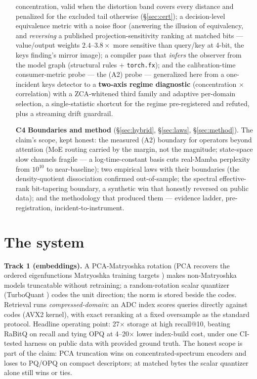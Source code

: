 \documentclass[11pt]{article}
\begin{document}
\begin{enumerate}
  concentration, valid when the distortion band covers every distance and
  penalized for the excluded tail otherwise (\S\ref{sec:cert}); a decision-level equivalence metric with a
  noise floor (answering the illusion of equivalency, and \emph{reversing} a
  published projection-sensitivity ranking at matched bits --- value/output
  weights $2.4$--$3.8\times$ more sensitive than query/key at 4-bit, the keys finding's mirror
  image); a compiler pass that \emph{infers} the observer from the model graph
  (structural rules $+$ \texttt{torch.fx}); and the calibration-time
  consumer-metric probe --- the (A2) probe --- generalized here from a one-incident
  keys detector to a \textbf{two-axis regime diagnostic} (concentration $\times$
  correlation) with a ZCA-whitened third family and adaptive per-domain selection,
  a single-statistic shortcut for the regime pre-registered and refuted, plus a
  streaming drift guardrail.
\item[\textbf{C4}] \textbf{Boundaries and method} (\S\ref{sec:hybrid},
  \S\ref{sec:laws}, \S\ref{sec:method}). The claim's scope, kept honest: the
  measured (A2) boundary for operators beyond attention (MoE routing carried by the
  margin, not the magnitude; state-space slow channels fragile --- a
  log-time-constant basis cuts real-Mamba perplexity from $10^{10}$ to
  near-baseline); two empirical laws with their boundaries (the density-quotient
  dissociation confirmed out-of-sample; the spectral effective-rank bit-tapering
  boundary, a synthetic win that honestly reversed on public data); and the
  methodology that produced them --- evidence ladder, pre-registration,
  incident-to-instrument.
\end{enumerate}

\section{The system}\label{sec:system}
\textbf{Track 1 (embeddings).} A PCA-Matryoshka rotation (PCA recovers the
ordered eigenfunctions Matryoshka training targets \cite{varici2025}) makes
non-Matryoshka models truncatable without retraining; a random-rotation
scalar quantizer (TurboQuant \cite{turboquantpaper}) codes the unit
direction; the norm is stored beside the codes. Retrieval runs
\emph{compressed-domain}: an ADC index scores queries directly against codes
(AVX2 kernel), with exact reranking at a fixed oversample as the standard
protocol. Headline operating point: 27$\times$ storage at high recall@10,
beating RaBitQ on recall and tying OPQ at 4--20$\times$ lower index-build
cost, under one CI-tested harness on public data with provided ground truth.
The honest scope is part of the claim: PCA truncation wins on
concentrated-spectrum encoders and loses to PQ/OPQ on compact descriptors;
at matched bytes the scalar quantizer alone still wins or ties.
\end{document}
